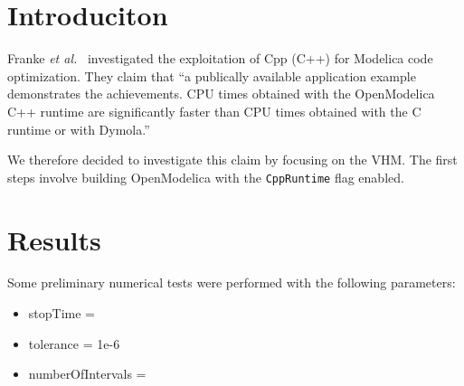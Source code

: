 \documentclass[10pt]{article}
\begin{document}
\newcommand{\bottomline}{\arrayrulecolor{white}\specialrule{\aboverulesep}{0pt}{0pt}%
	\arrayrulecolor{black}\specialrule{\heavyrulewidth}{0pt}{\belowbottomsep}}%

\newcommand{\bottomlinec}{\arrayrulecolor{tablerowcolor}\specialrule{\aboverulesep}{0pt}{0pt}%
	\arrayrulecolor{black}\specialrule{\heavyrulewidth}{0pt}{\belowbottomsep}}%

\newcommand{\bottomlinect}{\arrayrulecolor{tableheadcolor}\specialrule{\aboverulesep}{0pt}{0pt}%
	\arrayrulecolor{black}\specialrule{\heavyrulewidth}{0pt}{\belowbottomsep}}%



\maketitle



\pagestyle{myheadings}


\section{Introduciton}

Franke {\em et al.}~\cite{CppRuntime} investigated the exploitation of {\sf Cpp} ({\sf C++}) for Modelica code optimization. They claim that ``a publically available application example demonstrates the achievements. CPU times obtained with the OpenModelica~\cite{OpenModelica} C++ runtime are significantly faster than CPU times obtained with the C runtime or with Dymola.''

We therefore decided to investigate this claim by focusing on the VHM. The first steps involve building OpenModelica with the {\tt{CppRuntime}} flag enabled.

\section{Results}

Some preliminary numerical tests were performed with the following parameters:
\begin{itemize}
 \item stopTime = {}
 \item tolerance = {\sf 1e-6}
 \item numberOfIntervals = {}
\end{itemize}
\end{document}
